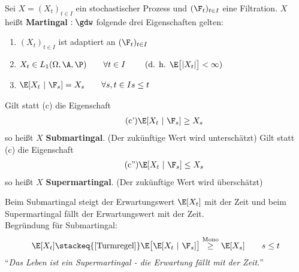 \begin{defi}[Martingal]\enter
Sei $X=(X_t)_{t\in I}$ ein stochastischer Prozess und $(\F_t)_{t\in I}$ eine Filtration. $X$ heißt \textbf{Martingal} $:\gdw$ folgende drei Eigenschaften gelten:
\begin{enumerate}[label=(\alph*)]
\item $(X_t)_{t\in I}$ ist adaptiert an $(\F_t)_{t\in I}$
\item $\begin{aligned}
		X_t\in L_1(\Omega,\A,\P) \qquad \forall t\in I\qquad\text{ (d. h. }\E\big[|X_t|\big]<\infty)
\end{aligned}$
\item $\begin{aligned}
\E[X_t~|~\F_s]=X_s\qquad\forall s,t\in I\mit s\leq t
\end{aligned}$
	
\end{enumerate}
Gilt statt (c) die Eigenschaft
\begin{align}\label{defSubmartingal}\tag{c'}
\E[X_t~|~\F_s]\geq X_s
\end{align}
so heißt $X$ \textbf{Submartingal}. (Der zukünftige Wert wird unterschätzt) \enter Gilt statt (c) die Eigenschaft
\begin{align}\label{defSupermartingal}\tag{c''}
\E[X_t~|~\F_s]\leq X_s
\end{align}
so heißt $X$ \textbf{Supermartingal}. (Der zukünftige Wert wird überschätzt)\\
\end{defi}

\begin{bemerkung}
Beim Submartingal steigt der Erwartungswert $\E[X_t]$ mit der Zeit und beim Supermartingal fällt der Erwartungswert mit der Zeit.\\
Begründung für Submartingal:
\begin{align*}
\E[X_t]\stackeq{\eqref{Turmregel}}
\E\big[\E[X_t~|~\F_s]\big]\stackrel{\text{Mono}}{\geq}\E[X_s]\qquad s\leq t
\end{align*}
``\textit{Das Leben ist ein Supermartingal - die Erwartung fällt mit der Zeit.}''
\end{bemerkung}

